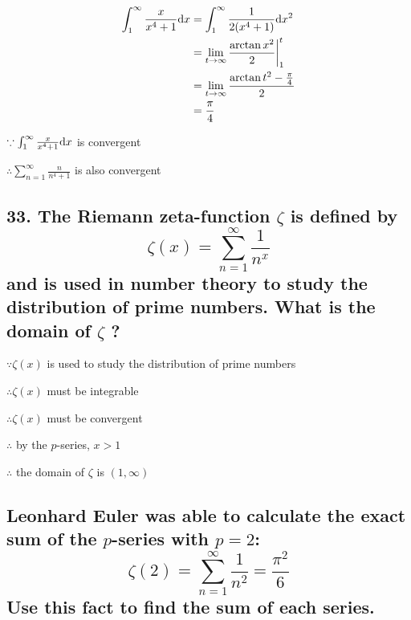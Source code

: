\documentclass{article}
\begin{document}
    $$\begin{aligned}
        \int_1^\infty \frac{x}{x^4+1} \textrm dx &= \int_1^\infty \frac{1}{2(x^4+1)} \textrm dx^2 \\
        &= \lim_{t \to \infty} \frac{\arctan x^2}{2} \biggl|_1^t \\
        &= \lim_{t \to \infty} \frac{\arctan t^2 - \frac \pi 4}{2} \\
        &= \frac \pi 4
    \end{aligned}$$

    $\because \int_1^\infty \frac{x}{x^4+1} \textrm dx$ is convergent

    $\therefore \sum_{n=1}^\infty \frac{n}{n^4+1}$ is also convergent

    \subsection*{33. The Riemann zeta-function $\zeta$ is defined by $$\zeta (x) = \sum_{n=1}^\infty \frac{1}{n^x}$$and is used in number theory to study the distribution of prime numbers. What is the domain of $\zeta$ ?}

    $\because \zeta (x)$ is used to study the distribution of prime numbers

    $\therefore \zeta (x)$ must be integrable

    $\therefore \zeta (x)$ must be convergent

    $\therefore$ by the $p$-series, $x>1$

    $\therefore$ the domain of $\zeta$ is $(1, \infty)$

    \subsection*{Leonhard Euler was able to calculate the exact sum of the $p$-series with $p = 2$:$$\zeta(2) = \sum_{n=1}^\infty \frac{1}{n^2} = \frac{\pi ^2}{6}$$ Use this fact to find the sum of each series.}
\end{document}
